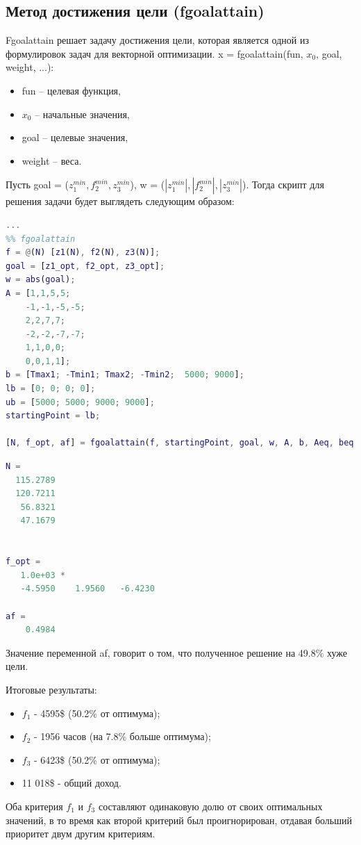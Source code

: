 \subsection{Метод достижения цели (fgoalattain)}
Fgoalattain решает задачу достижения цели, которая является одной из формулировок
задач для векторной оптимизации.
x = fgoalattain(fun, $x_0$, goal, weight, ...):
\begin{itemize}
\item fun – целевая функция,
\item $x_0$ – начальные значения,
\item goal – целевые значения,
\item weight – веса.
\end{itemize}
Пусть goal = ($z_1^{min}, f_2^{min}, z_3^{min}$), w = ($|z_1^{min}|, |f_2^{min}|, |z_3^{min}|$). Тогда скрипт для решения задачи будет выглядеть следующим образом:
\begin{lstlisting}[language={matlab}, caption={Метод достижения цели}]
...
%% fgoalattain
f = @(N) [z1(N), f2(N), z3(N)];
goal = [z1_opt, f2_opt, z3_opt];
w = abs(goal);
A = [1,1,5,5;
    -1,-1,-5,-5;
    2,2,7,7;
    -2,-2,-7,-7;
    1,1,0,0;
    0,0,1,1];
b = [Tmax1; -Tmin1; Tmax2; -Tmin2;  5000; 9000];
lb = [0; 0; 0; 0];
ub = [5000; 5000; 9000; 9000];
startingPoint = lb;

[N, f_opt, af] = fgoalattain(f, startingPoint, goal, w, A, b, Aeq, beq, lb, ub)
\end{lstlisting}
\begin{lstlisting}[language={matlab}, caption={Результат выполнения}]
N =
  115.2789
  120.7211
   56.8321
   47.1679


f_opt =
   1.0e+03 *
   -4.5950    1.9560   -6.4230

af =
    0.4984
\end{lstlisting}
Значение переменной af, говорит о том, что полученное решение на 49.8\% хуже цели. 

Итоговые результаты:
\begin{itemize}
\item $f_1$ - 4595\$ (50.2\% от оптимума);
\item $f_2$ - 1956 часов (на 7.8\% больше оптимума);
\item $f_3$ - 6423\$ (50.2\% от оптимума);
\item 11 018\$ - общий доход.
\end{itemize}
Оба критерия $f_1$ и $f_3$ составляют одинаковую долю от своих оптимальных значений, в то время как второй критерий был проигнорирован, отдавая больший приоритет двум другим критериям.

